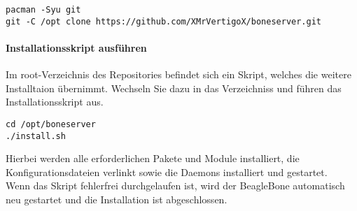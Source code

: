 \begin{lstlisting}
pacman -Syu git
git -C /opt clone https://github.com/XMrVertigoX/boneserver.git
\end{lstlisting}

\paragraph{Installationsskript ausführen} Im root-Verzeichnis des Repositories befindet sich ein Skript, welches die weitere Installtaion übernimmt. Wechseln Sie dazu in das Verzeichniss und führen das Installationsskript aus.

\begin{lstlisting}
cd /opt/boneserver
./install.sh
\end{lstlisting}

Hierbei werden alle erforderlichen Pakete und Module installiert, die Konfigurationsdateien verlinkt sowie die Daemons installiert und gestartet.\\

Wenn das Skript fehlerfrei durchgelaufen ist, wird der BeagleBone automatisch neu gestartet und die Installation ist abgeschlossen.
